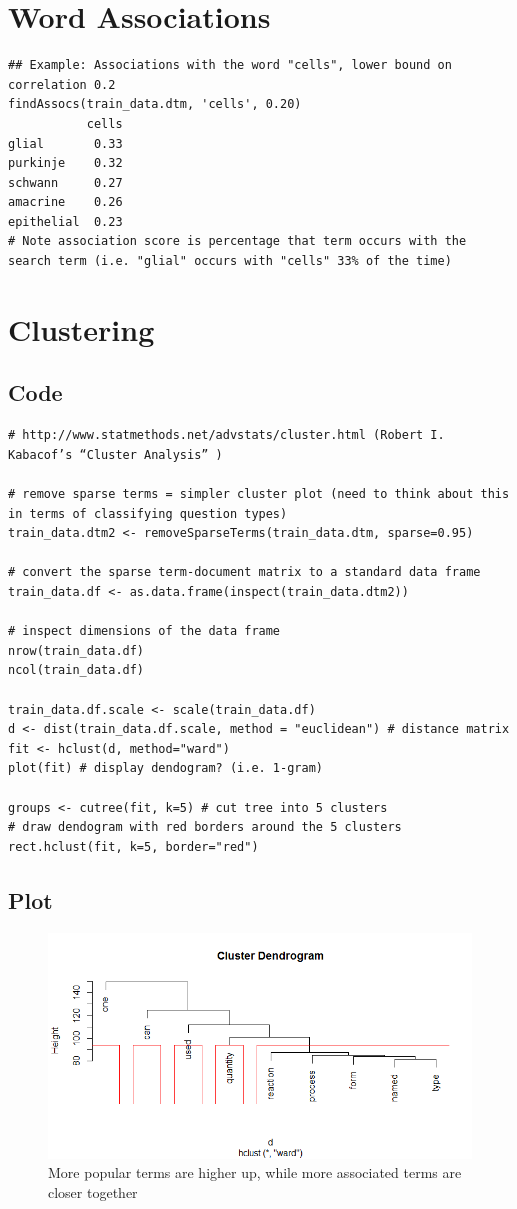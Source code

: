 \documentclass[12pt, oneside]{article}
\begin{document}
\section{Word Associations}
\begin{lstlisting}
## Example: Associations with the word "cells", lower bound on correlation 0.2
findAssocs(train_data.dtm, 'cells', 0.20)
           cells
glial       0.33
purkinje    0.32
schwann     0.27
amacrine    0.26
epithelial  0.23
# Note association score is percentage that term occurs with the search term (i.e. "glial" occurs with "cells" 33% of the time)
\end{lstlisting}

\section{Clustering}

\subsection{Code}
\begin{lstlisting}
# http://www.statmethods.net/advstats/cluster.html (Robert I. Kabacof’s “Cluster Analysis” )

# remove sparse terms = simpler cluster plot (need to think about this in terms of classifying question types)
train_data.dtm2 <- removeSparseTerms(train_data.dtm, sparse=0.95)

# convert the sparse term-document matrix to a standard data frame
train_data.df <- as.data.frame(inspect(train_data.dtm2))

# inspect dimensions of the data frame
nrow(train_data.df)
ncol(train_data.df)

train_data.df.scale <- scale(train_data.df)
d <- dist(train_data.df.scale, method = "euclidean") # distance matrix
fit <- hclust(d, method="ward")
plot(fit) # display dendogram? (i.e. 1-gram)

groups <- cutree(fit, k=5) # cut tree into 5 clusters
# draw dendogram with red borders around the 5 clusters
rect.hclust(fit, k=5, border="red")
\end{lstlisting}

\subsection{Plot}
\begin{figure}[h]
\includegraphics[scale=0.5]{./Plots/Rplot02.png}
\centering
\caption{More popular terms are higher up, while more associated terms are closer together}
\end{figure}
\end{document}
